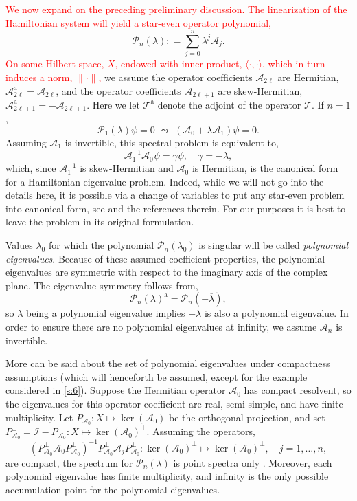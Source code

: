 \documentclass[review,onefignum,onetabnum]{siamart171218}
\def\ker{\mathop\mathrm{ker}\nolimits}
\def\coloneqq{\mathrel{\mathop:}=}
\newcommand{\rma}{\mathrm{a}}
\newcommand{\calA}{\mathcal{A}}
\newcommand{\calI}{\mathcal{I}}
\newcommand{\calP}{\mathcal{P}}
\newcommand{\calT}{\mathcal{T}}
\newcommand{\revised}[1]{ \textcolor{red}{#1} }
\begin{document}
\revised{%
We now expand on the preceding preliminary discussion. The linearization of the Hamiltonian system will yield a star-even operator polynomial,
}%
\[
\calP_n(\lambda)\coloneqq\sum_{j=0}^n\lambda^j\calA_j.
\]
\revised{
On some Hilbert space, $X$, endowed with inner-product,
$\langle\cdot,\cdot\rangle$, which in turn induces a norm, $\|\cdot\|$,
}
we assume the operator coefficients $\calA_{2\ell}$ are
Hermitian, $\calA_{2\ell}^\rma=\calA_{2\ell}$, and the operator coefficients
$\calA_{2\ell+1}$ are skew-Hermitian,
$\calA_{2\ell+1}^\rma=-\calA_{2\ell+1}$. Here we let $\calT^\rma$ denote the adjoint of the operator $\calT$. If $n=1$,
\[
\calP_1(\lambda)\psi=0\,\,\leadsto\,\,
\left(\calA_0+\lambda\calA_1\right)\psi=0.
\]
Assuming $\calA_1$ is invertible, this spectral problem is equivalent to,
\[
\calA_1^{-1}\calA_0\psi=\gamma\psi,\quad\gamma=-\lambda,
\]
which, since $\calA_1^{-1}$ is skew-Hermitian and $\calA_0$ is Hermitian, is the canonical form for a Hamiltonian eigenvalue problem. Indeed, while we will not go into the details here, it is possible via a change of variables to put any star-even problem into canonical form, see \cite[Section~3]{kapitula:iif13} and the references therein. For our purposes it is best to leave the problem in its original formulation.

Values $\lambda_0$ for which the polynomial
$\calP_n(\lambda_0)$ is singular will be called \textit{polynomial
eigenvalues}. Because of these assumed coefficient properties, the polynomial
eigenvalues are symmetric with respect to the imaginary axis of the complex
plane. The eigenvalue symmetry follows from,
\[
\calP_n(\lambda)^\rma=\calP_n(-\overline{\lambda}),
\]
so $\lambda$ being a polynomial eigenvalue implies $-\overline{\lambda}$ is also a polynomial eigenvalue.
In order to ensure there are no polynomial eigenvalues at infinity, we assume
$\calA_n$ is invertible.

More can be said about the set of polynomial eigenvalues under compactness
assumptions (which will henceforth be assumed, except for the example considered in \cref{s:6}). Suppose the Hermitian
operator $\calA_0$ has compact resolvent, so the eigenvalues for this
operator coefficient are real, semi-simple, and have finite multiplicity. Let
$P_{\calA_0}:X\mapsto\ker(\calA_0)$ be the orthogonal projection, and set
$P_{\calA_0}^\perp=\calI-P_{\calA_0}:X\mapsto\ker(\calA_0)^\perp$. Assuming
the operators,
\[
\left(P_{\calA_0}^\perp\calA_0P_{\calA_0}^\perp\right)^{-1}
P_{\calA_0}^\perp\calA_jP_{\calA_0}^\perp:\ker(\calA_0)^\perp\mapsto\ker(\calA_0)^\perp,\quad
j=1,\dots,n,
\]
are compact, the spectrum for $\calP_n(\lambda)$ is point spectra only
\cite[Remark~2.2]{bronski:aii14}. Moreover, each polynomial eigenvalue has
finite multiplicity, and infinity is the only possible accumulation point for
the polynomial eigenvalues.
\end{document}
